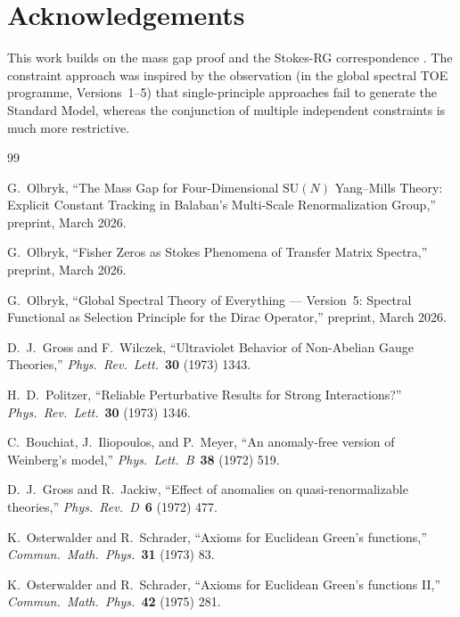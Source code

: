 \documentclass[12pt]{article}
\theoremstyle{definition}
\theoremstyle{remark}
\newcommand{\SU}{\mathrm{SU}}
\begin{document}
\section*{Acknowledgements}

This work builds on the mass gap proof \cite{Olbryk2026MG} and
the Stokes-RG correspondence \cite{OlbrykPsi2026}.  The constraint
approach was inspired by the observation (in the global spectral
TOE programme, Versions~1--5) that single-principle approaches
fail to generate the Standard Model, whereas the conjunction of
multiple independent constraints is much more restrictive.

\begin{thebibliography}{99}

G.~Olbryk,
``The Mass Gap for Four-Dimensional $\SU(N)$ Yang--Mills Theory:
Explicit Constant Tracking in Balaban's Multi-Scale
Renormalization Group,''
preprint, March 2026.

G.~Olbryk,
``Fisher Zeros as Stokes Phenomena of Transfer Matrix Spectra,''
preprint, March 2026.

G.~Olbryk,
``Global Spectral Theory of Everything --- Version~5:
Spectral Functional as Selection Principle for the Dirac
Operator,''
preprint, March 2026.

D.~J.~Gross and F.~Wilczek,
``Ultraviolet Behavior of Non-Abelian Gauge Theories,''
\textit{Phys.\ Rev.\ Lett.}\ \textbf{30} (1973) 1343.

H.~D.~Politzer,
``Reliable Perturbative Results for Strong Interactions?''
\textit{Phys.\ Rev.\ Lett.}\ \textbf{30} (1973) 1346.

C.~Bouchiat, J.~Iliopoulos, and P.~Meyer,
``An anomaly-free version of Weinberg's model,''
\textit{Phys.\ Lett.\ B}\ \textbf{38} (1972) 519.

D.~J.~Gross and R.~Jackiw,
``Effect of anomalies on quasi-renormalizable theories,''
\textit{Phys.\ Rev.\ D}\ \textbf{6} (1972) 477.

K.~Osterwalder and R.~Schrader,
``Axioms for Euclidean Green's functions,''
\textit{Commun.\ Math.\ Phys.}\ \textbf{31} (1973) 83.

K.~Osterwalder and R.~Schrader,
``Axioms for Euclidean Green's functions II,''
\textit{Commun.\ Math.\ Phys.}\ \textbf{42} (1975) 281.


\end{thebibliography}
\end{document}
